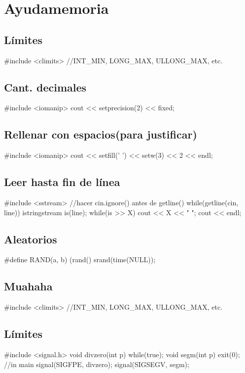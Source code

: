 \documentclass[10pt,landscape,twocolumn,a4paper,notitlepage]{article}
\begin{document}
\section{Ayudamemoria}
\subsection*{Límites}
\begin{code}
#include <climits> //INT_MIN, LONG_MAX, ULLONG_MAX, etc.
\end{code}
\subsection*{Cant. decimales}
\begin{code}
#include <iomanip>
cout << setprecision(2) << fixed;
\end{code}
\subsection*{Rellenar con espacios(para justificar)}
\begin{code}
#include <iomanip>
cout << setfill(' ') << setw(3) << 2 << endl;
\end{code}
\subsection*{Leer hasta fin de línea}
\begin{code}
#include <sstream>
//hacer cin.ignore() antes de getline()
while(getline(cin, line)){
   	 istringstream is(line);
   	 while(is >> X)
   		 cout << X << " ";
   	 cout << endl;
}
\end{code}
\subsection*{Aleatorios}
\begin{code}
#define RAND(a, b) (rand()%
srand(time(NULL));
\end{code}
\subsection*{Muahaha}
\begin{code}
#include <climits> //INT_MIN, LONG_MAX, ULLONG_MAX, etc.
\end{code}
\subsection*{Límites}
\begin{code}
#include <signal.h>
void divzero(int p){
	while(true);}
void segm(int p){
	exit(0);}
//in main
signal(SIGFPE, divzero);
signal(SIGSEGV, segm);
\end{code}
\end{document}
